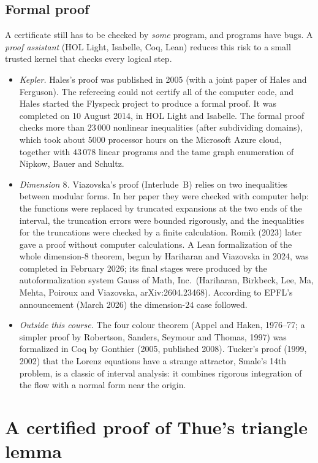 \documentclass[11pt,openany]{book}
\theoremstyle{plain}
\theoremstyle{definition}
\theoremstyle{remark}
\begin{document}
\subsection{Formal proof}
A certificate still has to be checked by \emph{some} program, and programs have bugs. A \emph{proof
assistant} (HOL Light, Isabelle, Coq, Lean) reduces this risk to a small trusted kernel that checks every
logical step.
\begin{itemize}
\item \emph{Kepler.} Hales's proof was published in 2005 (with a joint paper of Hales and Ferguson). The
  refereeing could not certify all of the computer code, and Hales started the Flyspeck project to produce a
  formal proof. It was completed on 10 August 2014, in HOL Light and
  Isabelle. The formal proof checks more than $23\,000$ nonlinear inequalities (after subdividing domains),
  which took about $5000$ processor hours on the Microsoft Azure cloud, together with $43\,078$ linear
  programs and the tame graph enumeration of Nipkow, Bauer and Schultz.
\item \emph{Dimension $8$.} Viazovska's proof (Interlude~B) relies on two inequalities between
  modular forms. In her paper they were checked with computer help: the functions were replaced by truncated
  expansions at the two ends of the interval, the truncation errors were bounded rigorously, and the
  inequalities for the truncations were checked by a finite calculation. Romik (2023) later gave a proof
  without computer calculations. A Lean formalization of the whole dimension-$8$ theorem, begun by Hariharan
  and Viazovska in 2024, was completed in February 2026; its final stages were produced by the
  autoformalization system Gauss of Math, Inc.\ (Hariharan, Birkbeck, Lee, Ma, Mehta, Poiroux and
  Viazovska, arXiv:2604.23468). According to EPFL's announcement (March 2026) the dimension-$24$ case followed.
\item \emph{Outside this course.} The four colour theorem (Appel and Haken, 1976--77; a simpler proof by
  Robertson, Sanders, Seymour and Thomas, 1997) was formalized in Coq by Gonthier (2005, published 2008).
  Tucker's proof (1999, 2002) that the Lorenz equations have a strange attractor, Smale's 14th problem,
  is a classic of interval analysis: it combines rigorous integration of the flow with a normal form near
  the origin.
\end{itemize}

\section{A certified proof of Thue's triangle lemma}
\label{COMP:sec:thue}
\end{document}
